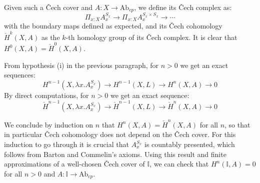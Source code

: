 \documentclass[letterpaper]{../util/easychair}
\newcommand{\N}{\mathbb{N}}
\begin{document}
Given such a \v{C}ech cover and $A:X\to \mathrm{Ab}_{cp}$, we define its \v{C}ech complex as:
\[\Pi_{x:X}A_x^{S_x} \to \Pi_{x:X}A_x^{S_x\times S_x} \to \cdots\]
with the boundary maps defined as expected, and its \v{C}ech cohomology $\check{H}^k(X,A)$ as the $k$-th homology group of its \v{C}ech complex. It is clear that $H^0(X,A) = \check{H}^0(X,A)$.

From hypothesis (i) in the previous paragraph, for $n>0$ we get an exact sequences:
\[H^{n-1}(X,\lambda x.A_x^{S_x}) \to H^{n-1}(X,L)\to H^n(X,A)\to 0\]
By direct computations, for $n>0$ we get an exact sequence:
\[\check{H}^{n-1}(X,\lambda x.A_x^{S_x}) \to \check{H}^{n-1}(X,L)\to \check{H}^n(X,A)\to 0\]

We conclude by induction on $n$ that $H^n(X,A) = \check{H}^n(X,A)$ for all $n$, so that in particular \v{C}ech cohomology does not depend on the \v{C}ech cover. For this induction to go through it is crucial that $A_x^{S_x}$ is countably presented, which follows from Barton and Commelin's axioms.  Using this result and finite approximations of a well-chosen \v{C}ech cover of $\mathbb{I}$, we can check that $H^n(\mathbb{I},A) = 0$ for all $n>0$ and $A:\mathbb{I}\to \mathrm{Ab}_{cp}$.


\printbibliography
\end{document}
